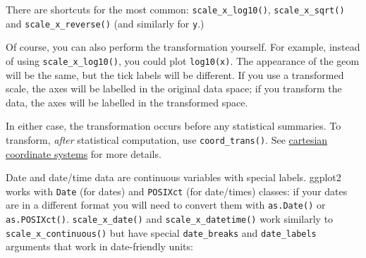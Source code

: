 There are shortcuts for the most common: \texttt{scale\_x\_log10()},
\texttt{scale\_x\_sqrt()} and \texttt{scale\_x\_reverse()} (and
similarly for \texttt{y}.)  

Of course, you can also perform the transformation yourself. For
example, instead of using \texttt{scale\_x\_log10()}, you could plot
\texttt{log10(x)}. The appearance of the geom will be the same, but the
tick labels will be different. If you use a transformed scale, the axes
will be labelled in the original data space; if you transform the data,
the axes will be labelled in the transformed space.

In either case, the transformation occurs before any statistical
summaries. To transform, \emph{after} statistical computation, use
\texttt{coord\_trans()}. See \protect\hyperlink{sub:cartesian}{cartesian
coordinate systems} for more details.

Date and date/time data are continuous variables with special labels.
ggplot2 works with \texttt{Date} (for dates) and \texttt{POSIXct} (for
date/times) classes: if your dates are in a different format you will
need to convert them with \texttt{as.Date()} or \texttt{as.POSIXct()}.
  
 
\texttt{scale\_x\_date()} and \texttt{scale\_x\_datetime()} work
similarly to \texttt{scale\_x\_continuous()} but have special
\texttt{date\_breaks} and \texttt{date\_labels} arguments that work in
date-friendly units:

